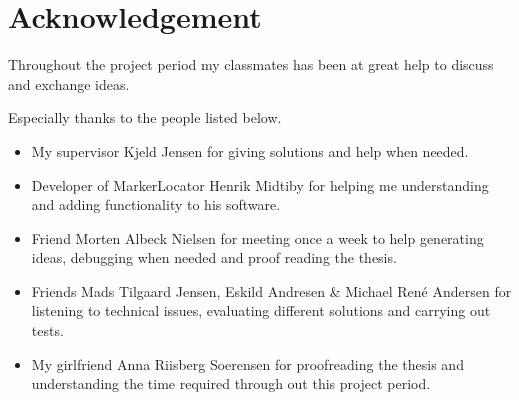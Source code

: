 \section*{Acknowledgement}
Throughout the project period my classmates has been at great help to discuss and exchange ideas.

Especially thanks to the people listed below.
\begin{itemize}
	\item My supervisor Kjeld Jensen for giving solutions and help when needed.
	\item Developer of MarkerLocator Henrik Midtiby for helping me understanding and adding functionality to his software.
	\item Friend Morten Albeck Nielsen for meeting once a week to help generating ideas, debugging when needed and proof reading the thesis.
	\item Friends Mads Tilgaard Jensen, Eskild Andresen \& Michael René Andersen for listening to technical issues, evaluating different solutions and carrying out tests.
	\item My girlfriend Anna Riisberg Soerensen for proofreading the thesis and understanding the time required through out this project period.
\end{itemize}